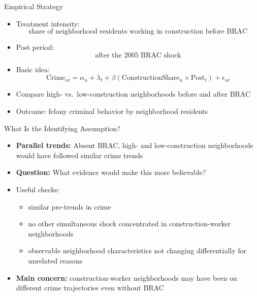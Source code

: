 \documentclass[11pt,notes=hide,aspectratio=169,mathserif]{beamer}
\begin{document}
\begin{frame}{Empirical Strategy}
\begin{itemize}
\item Treatment intensity:
\[
\text{share of neighborhood residents working in construction before BRAC}
\]
\pause \item Post period:
\[
\text{after the 2005 BRAC shock}
\]
\pause \item Basic idea:
\[
\text{Crime}_{nt}=\alpha_n+\lambda_t+\beta(\text{ConstructionShare}_n \times \text{Post}_t)+\epsilon_{nt}
\]
\pause \item Compare high- vs.\ low-construction neighborhoods before and after BRAC
\pause \item Outcome: felony criminal behavior by neighborhood residents
\end{itemize}
\end{frame}

\begin{frame}{What Is the Identifying Assumption?}
\begin{itemize}
\pause \item \textbf{Parallel trends:}
\pause Absent BRAC, high- and low-construction neighborhoods would have 
followed similar crime trends
\pause \item \textbf{Question:} What evidence would make this more believable?
\pause \item Useful checks:
\begin{itemize}
\item similar pre-trends in crime
\item no other simultaneous shock concentrated in construction-worker neighborhoods
\item observable neighborhood characteristics not changing differentially for unrelated reasons
\end{itemize}
\pause \item \textbf{Main concern:} construction-worker neighborhoods may have been on different crime trajectories even without BRAC
\end{itemize}
\end{frame}
\end{document}
